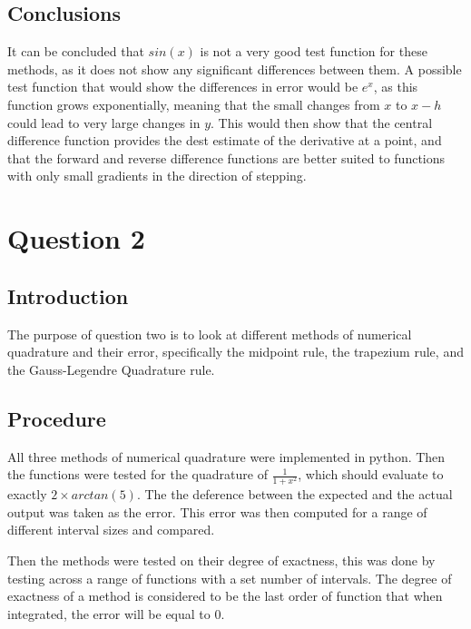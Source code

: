 \documentclass[11pt]{article}
\begin{document}
\hypertarget{conclusions}{%
\subsection{Conclusions}\label{conclusions}}

It can be concluded that \(sin(x)\) is not a very good test function for
these methods, as it does not show any significant differences between
them. A possible test function that would show the differences in error
would be \(e^x\), as this function grows exponentially, meaning that the
small changes from \(x\) to \(x-h\) could lead to very large changes in
\(y\). This would then show that the central difference function
provides the dest estimate of the derivative at a point, and that the
forward and reverse difference functions are better suited to functions
with only small gradients in the direction of stepping.

    \hypertarget{question-2}{%
\section{Question 2}\label{question-2}}

\hypertarget{introduction}{%
\subsection{Introduction}\label{introduction}}

The purpose of question two is to look at different methods of numerical
quadrature and their error, specifically the midpoint rule, the
trapezium rule, and the Gauss-Legendre Quadrature rule.

\hypertarget{procedure}{%
\subsection{Procedure}\label{procedure}}

All three methods of numerical quadrature were implemented in python.
Then the functions were tested for the quadrature of
\(\frac{1}{1+x^2}\), which should evaluate to exactly
\(2 \times arctan(5)\). The the deference between the expected and the
actual output was taken as the error. This error was then computed for a
range of different interval sizes and compared.

Then the methods were tested on their degree of exactness, this was done
by testing across a range of functions with a set number of intervals.
The degree of exactness of a method is considered to be the last order
of function that when integrated, the error will be equal to 0.
\end{document}
